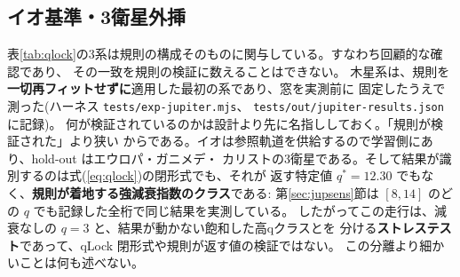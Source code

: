 \documentclass[a4paper,10pt,twocolumn]{ltjsarticle}
\begin{document}
\subsection{イオ基準・3衛星外挿}
\label{sec:jupiter}

表\ref{tab:qlock}の3系は規則の構成そのものに関与している。すなわち回顧的な確認であり、
その一致を規則の検証に数えることはできない。
木星系は、規則を\textbf{一切再フィットせずに}適用した最初の系であり、窓を実測前に
固定したうえで測った(ハーネス \texttt{tests/exp-jupiter.mjs}、
\texttt{tests/out/jupiter-results.json} に記録)。
何が検証されているのかは設計より先に名指ししておく。「規則が検証された」より狭い
からである。イオは参照軌道を供給するので学習側にあり、hold-out はエウロパ・ガニメデ・
カリストの3衛星である。そして結果が識別するのは式(\ref{eq:qlock})の閉形式でも、それが
返す特定値 $q^{*}=12.30$ でもなく、\textbf{規則が着地する強減衰指数のクラス}である:
第\ref{sec:jupsens}節は $[8,14]$ のどの $q$ でも記録した全桁で同じ結果を実測している。
したがってこの走行は、減衰なしの $q=3$ と、結果が動かない飽和した高qクラスとを
分ける\textbf{ストレステスト}であって、qLock 閉形式や規則が返す値の検証ではない。
この分離より細かいことは何も述べない。
\end{document}
